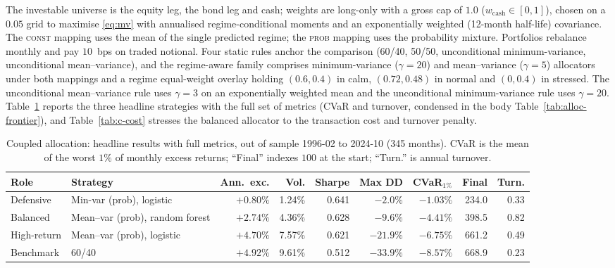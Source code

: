The investable universe is the equity leg, the bond leg and cash; weights are long-only with
a gross cap of $1.0$ ($w_{\mathrm{cash}}\in[0,1]$), chosen on a $0.05$ grid to maximise
\eqref{eq:mv} with annualised regime-conditional moments and an exponentially weighted
(12-month half-life) covariance. The \textsc{const} mapping uses the mean of the single
predicted regime; the \textsc{prob} mapping uses the probability mixture. Portfolios
rebalance monthly and pay $10$~bps on traded notional. Four static rules anchor the
comparison (60/40, 50/50, unconditional minimum-variance, unconditional mean--variance), and
the regime-aware family comprises minimum-variance ($\gamma{=}20$) and mean--variance
($\gamma{=}5$) allocators under both mappings and a regime equal-weight overlay holding
$(0.6,0.4)$ in calm, $(0.72,0.48)$ in normal and $(0,0.4)$ in stressed. The unconditional
mean--variance rule uses $\gamma{=}3$ on an exponentially weighted mean and the unconditional
minimum-variance rule uses $\gamma{=}20$. Table~\ref{tab:c-headline} reports the three
headline strategies with the full set of metrics (CVaR and turnover, condensed in the body
Table~\ref{tab:alloc-frontier}), and Table~\ref{tab:c-cost} stresses the balanced allocator
to the transaction cost and turnover penalty.

\begin{table}[H]
\centering
\caption{Coupled allocation: headline results with full metrics, out of sample 1996-02 to 2024-10 (345 months). CVaR is the mean of the worst $1\%$ of monthly excess returns; ``Final''
indexes $100$ at the start; ``Turn.'' is annual turnover.}
\label{tab:c-headline}
\small
\begin{adjustbox}{center,max width=\linewidth}
\begin{tabular}{llrrrrrrr}
\toprule
Role & Strategy & Ann.\ exc. & Vol. & Sharpe & Max DD & CVaR$_{1\%}$ & Final & Turn. \\
\midrule
Defensive   & Min-var (prob), logistic        & $+0.80\%$ & 1.24\%  & 0.641 & $-2.0\%$  & $-1.03\%$ & 234.0 & 0.33 \\
Balanced    & Mean--var (prob), random forest & $+2.74\%$ & 4.36\%  & 0.628 & $-9.6\%$  & $-4.41\%$ & 398.5 & 0.82 \\
High-return & Mean--var (prob), logistic      & $+4.70\%$ & 7.57\%  & 0.621 & $-21.9\%$ & $-6.75\%$ & 661.2 & 0.49 \\
Benchmark   & 60/40                           & $+4.92\%$ & 9.61\%  & 0.512 & $-33.9\%$ & $-8.57\%$ & 668.9 & 0.23 \\
\bottomrule
\end{tabular}
\end{adjustbox}
\end{table}

